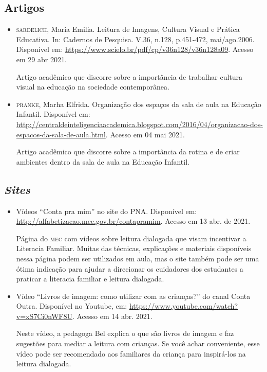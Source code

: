 \documentclass[11pt]{extarticle}
\begin{document}
\subsection{Artigos}

\begin{itemize}
\item \textsc{sardelich}, Maria Emilia. Leitura de Imagens, Cultura Visual e Prática Educativa. 
In: Cadernos de Pesquisa. V.36, n.128, p.451-472, mai/ago.2006. Disponível em: \url{https://www.scielo.br/pdf/cp/v36n128/v36n128a09}. 
Acesso em 29 abr 2021. 

Artigo acadêmico que discorre sobre a importância de trabalhar cultura 
visual na educação na sociedade contemporânea. 

\item \textsc{pranke}, Marha Elfrida. Organização dos espaços da sala de aula na Educação Infantil. Disponível em: \url{http://centraldeinteligenciaacademica.blogspot.com/2016/04/organizacao-dos-espacos-da-sala-de-aula.html}. Acesso em 04 mai 2021. 

Artigo acadêmico que discorre sobre a importância da rotina e de criar ambientes dentro da sala de aula na Educação Infantil.  
\end{itemize}

\subsection{\textit{Sites}}

\begin{itemize}
\item Vídeos “Conta pra mim” no site do PNA. Disponível em: \url{http://alfabetizacao.mec.gov.br/contapramim}. 
Acesso em 13 abr. de 2021.

Página do \textsc{mec} com vídeos sobre leitura dialogada que visam incentivar a Literacia Familiar. Muitas das 
técnicas, explicações e materiais disponíveis nessa página podem ser utilizados em aula, mas o site também 
pode ser uma ótima indicação para ajudar a direcionar os cuidadores dos estudantes a praticar 
a literacia familiar e leitura dialogada.

\item Vídeo “Livros de imagem: como utilizar com as crianças?” do canal Conta Outra. Disponível no Youtube, em: \url{https://www.youtube.com/watch?v=xS7Ci0nWF8U}. 
Acesso em 14 abr. 2021. 

Neste vídeo, a pedagoga Bel explica o que são livros de imagem e faz sugestões para mediar a leitura com 
crianças. Se você achar conveniente, esse vídeo pode ser recomendado aos familiares da criança 
para inspirá-los na leitura dialogada. 
\end{itemize}
\end{document}
